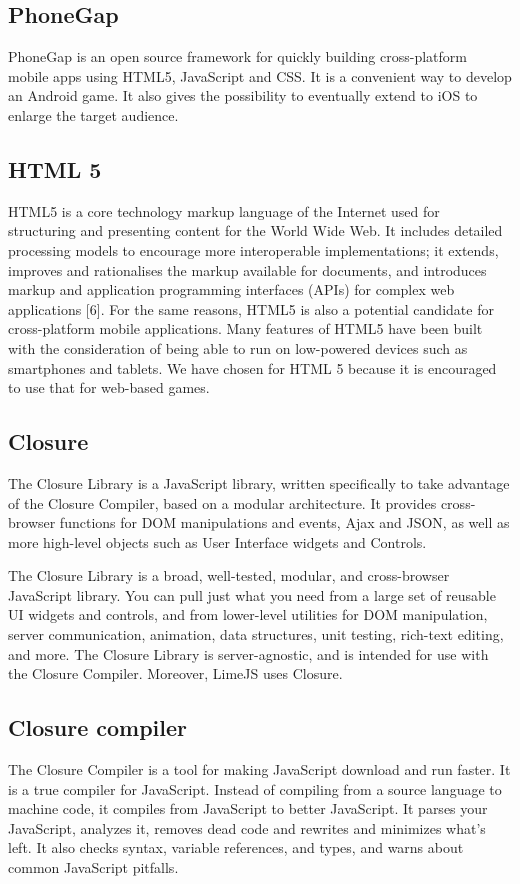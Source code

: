 \subsection{PhoneGap}

PhoneGap is an open source framework for quickly building cross-platform mobile apps using HTML5, JavaScript and CSS. It is a convenient way to develop an Android game. It also gives the possibility to eventually extend to iOS to enlarge the target audience.

\subsection{HTML 5}

HTML5 is a core technology markup language of the Internet used for structuring and presenting content for the World Wide Web. It includes detailed processing models to encourage more interoperable implementations; it extends, improves and rationalises the markup available for documents, and introduces markup and application programming interfaces (APIs) for complex web applications [6]. For the same reasons, HTML5 is also a potential candidate for cross-platform mobile applications. Many features of HTML5 have been built with the consideration of being able to run on low-powered devices such as smartphones and tablets. We have chosen for HTML 5 because it is encouraged to use that for web-based games.

 \subsection{Closure}

The Closure Library is a JavaScript library, written specifically to take advantage of the Closure Compiler, based on a modular architecture. It provides cross-browser functions for DOM manipulations and events, Ajax and JSON, as well as more high-level objects such as User Interface widgets and Controls.

The Closure Library is a broad, well-tested, modular, and cross-browser JavaScript library. You can pull just what you need from a large set of reusable UI widgets and controls, and from lower-level utilities for DOM manipulation, server communication, animation, data structures, unit testing, rich-text editing, and more.
The Closure Library is server-agnostic, and is intended for use with the Closure Compiler.
Moreover, LimeJS uses Closure. 

\subsection{Closure compiler}
The Closure Compiler is a tool for making JavaScript download and run faster. It is a true compiler for JavaScript. Instead of compiling from a source language to machine code, it compiles from JavaScript to better JavaScript. It parses your JavaScript, analyzes it, removes dead code and rewrites and minimizes what's left. It also checks syntax, variable references, and types, and warns about common JavaScript pitfalls.


